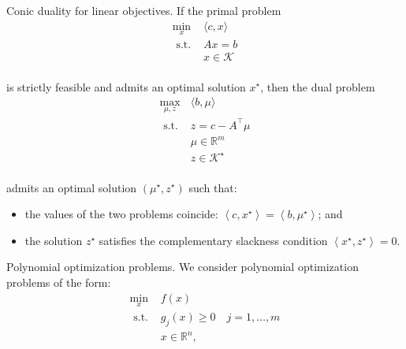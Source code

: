 \begin{theorem}[L9.5]{Conic duality for linear objectives.}
    If the primal problem
    \vspace{-4pt}\\
    $$
    \begin{aligned}
    \min _x & \langle c, x\rangle \\
    \text { s.t. } & A x=b \\
    & x \in \mathcal{K}
    \end{aligned}
    $$
    \vspace{-4pt}\\
    is strictly feasible and admits an optimal solution $x^{\star}$, then the dual problem
    \vspace{-4pt}\\
    $$
    \begin{array}{cl}
    \max _{\mu, z} & \langle b, \mu\rangle \\
    \text { s.t. } & z=c-A^{\top} \mu \\
    & \mu \in \mathbb{R}^m \\
    & z \in \mathcal{K}^{\star}
    \end{array}
    $$
    \vspace{-7pt}\\
    admits an optimal solution $\left(\mu^{\star}, z^{\star}\right)$ such that:
    \begin{itemize}[leftmargin=*]
        \item the values of the two problems coincide: $\left\langle c, x^{\star}\right\rangle=\left\langle b, \mu^{\star}\right\rangle$; and\vspace{-4pt}
        \item the solution $z^{\star}$ satisfies the complementary slackness condition $\left\langle x^{\star}, z^{\star}\right\rangle=0$.       
    \end{itemize}
\end{theorem}


\begin{remark}[L10.1]{Polynomial optimization problems.}
    We consider polynomial optimization problems of the form:
    \vspace{-4pt}\\
    $$
    \begin{array}{cl}
        \min _x & f(x) \\
        \text { s.t. } & g_j(x) \geq 0 \quad j=1, \ldots, m \\
        & x \in \mathbb{R}^n,
        \end{array}
    $$
    \vspace{-5pt}
\end{remark}

